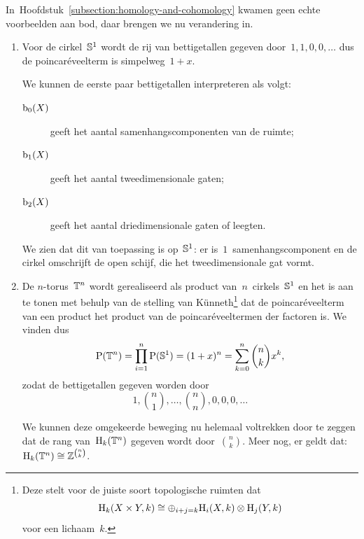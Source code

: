 \documentclass[a4paper,11pt,openany,oneside,article]{memoir}
\begin{document}
In~Hoofdstuk~\ref{subsection:homology-and-cohomology} kwamen geen echte voorbeelden aan bod, daar brengen we nu verandering in.
\begin{example} \hfil
  \label{example:betti-numbers}
  \begin{enumerate}
    \item Voor de cirkel~$\mathbb{S}^1$ wordt de rij van bettigetallen gegeven door~$1,1,0,0,\ldots$ dus de poincar\'eveelterm is simpelweg~$1+x$.
      
      We kunnen de eerste paar bettigetallen interpreteren als volgt:
      \begin{description}
        \item[$\mathrm{b}_0(X)$] geeft het aantal samenhangscomponenten van de ruimte;
        \item[$\mathrm{b}_1(X)$] geeft het aantal tweedimensionale gaten;
        \item[$\mathrm{b}_2(X)$] geeft het aantal driedimensionale gaten of leegten.
      \end{description}

      We zien dat dit van toepassing is op~$\mathbb{S}^1$: er is~$1$~samenhangscomponent en de cirkel omschrijft de open schijf, die het tweedimensionale gat vormt.

    \item De $n$\nobreakdash-torus~$\mathbb{T}^n$ wordt gerealiseerd als product van~$n$~cirkels~$\mathbb{S}^1$ en het is aan te tonen met behulp van de stelling van K\"unneth\footnote{Deze stelt voor de juiste soort topologische ruimten dat
      \begin{equation}
        \mathrm{H}_k(X\times Y,k)\cong\oplus_{i+j=k}\mathrm{H}_i(X,k)\otimes\mathrm{H}_j(Y,k)
      \end{equation}
      voor een lichaam~$k$.
      } dat de poincar\'eveelterm van een product het product van de poincar\'eveeltermen der factoren is. We vinden dus
      \begin{equation}
        \mathrm{P}(\mathbb{T}^n)=\prod_{i=1}^n\mathrm{P}(\mathbb{S}^1)=(1+x)^n=\sum_{k=0}^n\binom{n}{k}x^k,
      \end{equation}
      zodat de bettigetallen gegeven worden door
      \begin{equation}
        1,\binom{n}{1},\ldots,\binom{n}{n},0,0,0,\ldots
      \end{equation}

      We kunnen deze omgekeerde beweging nu helemaal voltrekken door te zeggen dat de rang van~$\mathrm{H}_k(\mathbb{T}^n)$ gegeven wordt door~$\binom{n}{k}$. Meer nog, er geldt dat:~$\mathrm{H}_k(\mathbb{T}^n)\cong\mathbb{Z}^{\binom{n}{k}}$.


\end{enumerate}
\end{example}
\end{document}
